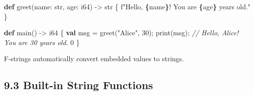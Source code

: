 \documentclass[
  english,
]{book}
\newenvironment{Shaded}{\begin{snugshade}}{\end{snugshade}}
\newcommand{\CommentTok}[1]{\textcolor[rgb]{0.42,0.60,0.33}{\textit{#1}}}
\newcommand{\ControlFlowTok}[1]{\textcolor[rgb]{0.77,0.53,0.75}{\textbf{#1}}}
\newcommand{\DataTypeTok}[1]{\textcolor[rgb]{0.31,0.79,0.69}{#1}}
\newcommand{\DecValTok}[1]{\textcolor[rgb]{0.71,0.81,0.66}{#1}}
\newcommand{\FunctionTok}[1]{\textcolor[rgb]{0.86,0.86,0.67}{#1}}
\newcommand{\KeywordTok}[1]{\textcolor[rgb]{0.34,0.61,0.84}{\textbf{#1}}}
\newcommand{\NormalTok}[1]{\textcolor[rgb]{0.83,0.83,0.83}{#1}}
\newcommand{\OperatorTok}[1]{\textcolor[rgb]{0.83,0.83,0.83}{#1}}
\newcommand{\StringTok}[1]{\textcolor[rgb]{0.81,0.57,0.47}{#1}}
\begin{document}
\begin{Shaded}
\begin{Highlighting}[]
\KeywordTok{def}\NormalTok{ greet(name: }\DataTypeTok{str}\NormalTok{, age: }\DataTypeTok{i64}\NormalTok{) }\OperatorTok{{-}\textgreater{}} \DataTypeTok{str}\NormalTok{ \{}
    \StringTok{f"Hello, }\ControlFlowTok{\{}\NormalTok{name}\ControlFlowTok{\}}\StringTok{! You are }\ControlFlowTok{\{}\NormalTok{age}\ControlFlowTok{\}}\StringTok{ years old."}
\NormalTok{\}}

\KeywordTok{def}\NormalTok{ main() }\OperatorTok{{-}\textgreater{}} \DataTypeTok{i64}\NormalTok{ \{}
    \KeywordTok{val}\NormalTok{ msg }\OperatorTok{=}\NormalTok{ greet(}\StringTok{"Alice"}\NormalTok{, }\DecValTok{30}\NormalTok{);}
    \FunctionTok{print}\NormalTok{(msg);   }\CommentTok{// Hello, Alice! You are 30 years old.}
    \DecValTok{0}
\NormalTok{\}}
\end{Highlighting}
\end{Shaded}

F-strings automatically convert embedded values to strings.

\subsection{9.3 Built-in String
Functions}\label{built-in-string-functions}
\end{document}
